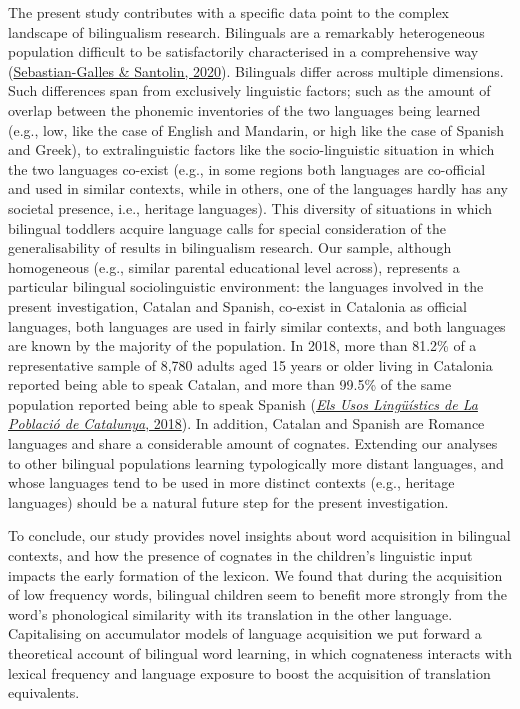 \documentclass[
]{article}
\begin{document}
The present study contributes with a specific data point to the complex
landscape of bilingualism research. Bilinguals are a remarkably
heterogeneous population difficult to be satisfactorily characterised in
a comprehensive way
(\protect\hyperlink{ref-sebastian-galles2020bilingual}{Sebastian-Galles
\& Santolin, 2020}). Bilinguals differ across multiple dimensions. Such
differences span from exclusively linguistic factors; such as the amount
of overlap between the phonemic inventories of the two languages being
learned (e.g., low, like the case of English and Mandarin, or high like
the case of Spanish and Greek), to extralinguistic factors like the
socio-linguistic situation in which the two languages co-exist (e.g., in
some regions both languages are co-official and used in similar
contexts, while in others, one of the languages hardly has any societal
presence, i.e., heritage languages). This diversity of situations in
which bilingual toddlers acquire language calls for special
consideration of the generalisability of results in bilingualism
research. Our sample, although homogeneous (e.g., similar parental
educational level across), represents a particular bilingual
sociolinguistic environment: the languages involved in the present
investigation, Catalan and Spanish, co-exist in Catalonia as official
languages, both languages are used in fairly similar contexts, and both
languages are known by the majority of the population. In 2018, more
than 81.2\% of a representative sample of 8,780 adults aged 15 years or
older living in Catalonia reported being able to speak Catalan, and more
than 99.5\% of the same population reported being able to speak Spanish
(\protect\hyperlink{ref-2018els}{\emph{Els Usos Lingüístics de La
Població de Catalunya}, 2018}). In addition, Catalan and Spanish are
Romance languages and share a considerable amount of cognates. Extending
our analyses to other bilingual populations learning typologically more
distant languages, and whose languages tend to be used in more distinct
contexts (e.g., heritage languages) should be a natural future step for
the present investigation.

To conclude, our study provides novel insights about word acquisition in
bilingual contexts, and how the presence of cognates in the children's
linguistic input impacts the early formation of the lexicon. We found
that during the acquisition of low frequency words, bilingual children
seem to benefit more strongly from the word's phonological similarity
with its translation in the other language. Capitalising on accumulator
models of language acquisition we put forward a theoretical account of
bilingual word learning, in which cognateness interacts with lexical
frequency and language exposure to boost the acquisition of translation
equivalents.
\end{document}
